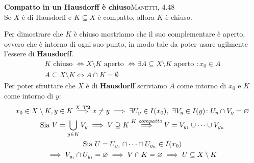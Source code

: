\begin{theorema}\textbf{Compatto in un Hausdorff è chiuso}\textsc{Manetti, 4.48} \label{compatto in hausdorff chiuso} \\
Se $X$ è di Hausdorff e $K\subseteq X$ è compatto, allora $K$ è chiuso.
\end{theorema}
\begin{demonstration}
	Per dimostrare che $K$ è chiuso mostriamo che il suo complementare è aperto, ovvero che è intorno di ogni suo punto, in modo tale da poter usare agilmente l'essere di \textbf{Hausdorff}.
		\begin{gather*}
			K \text{ chiuso } \iff X\setminus K \text{ aperto } \iff \exists A\subseteq X\setminus K \text{ aperto } \colon x_0\in A \\
			A\subseteq X\setminus K \iff A\cap K=\emptyset
		\end{gather*}
	Per poter sfruttare che $X$ è di \textbf{Hausdorff} scriviamo $A$ come intorno di $x_0$ e $K$ come intorno di $y$:
		\begin{gather*}
			x_0\in X\setminus K, y\in K \stackrel{X\ \textbf{T2}}{\implies} x\neq y\implies \exists U_y\in I(x_0), \ \exists V_y\in I(y) \colon U_y\cap V_y=\emptyset \\
			\text{Sia } V=\union_{y\in K}V_y \implies V\supseteq K \stackrel{K\ compatto}{\Longrightarrow} V=V_{y_1}\cup\dots\cup V_{y_n} \\
			\text{Sia } U=U_{y_1}\cap\dots\cap U_{y_n} \in I(x_0)\\
			\implies V_{y_i}\cap U_{y_i}=\emptyset \implies V\cap K=\emptyset \implies U\subseteq X\setminus K
		\end{gather*}
\end{demonstration}

